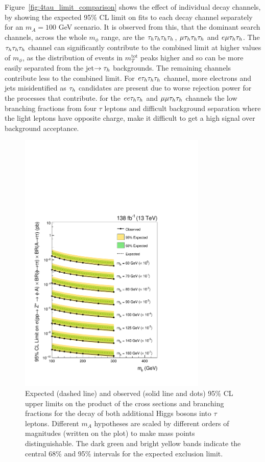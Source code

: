 Figure~\ref{fig:4tau_limit_comparison} shows the effect of individual decay channels, by showing the expected 95\% \ac{CL} limit on fits to each decay channel separately for an $m_{A} = 100$ GeV scenario.
It is observed from this, that the dominant search channels, across the whole $m_{\phi}$ range, are the $\tau_{h}\tau_{h}\tau_{h}\tau_{h}$, $\mu\tau_{h}\tau_{h}\tau_{h}$ and $e\mu\tau_{h}\tau_{h}$.
The $\tau_{h}\tau_{h}\tau_{h}$ channel can significantly contribute to the combined limit at higher values of $m_{\phi}$, as the distribution of events in $m_{T}^{\text{tot}}$ peaks higher and so can be more easily separated from the jet$\rightarrow\tau_{h}$ backgrounds.
The remaining channels contribute less to the combined limit.
For $e\tau_{h}\tau_{h}\tau_{h}$ channel, more electrons and jets misidentified as $\tau_{h}$ candidates are present due to worse rejection power for the processes that contribute.
for the $ee\tau_{h}\tau_{h}$ and $\mu\mu\tau_{h}\tau_{h}$ channels the low branching fractions from four $\tau$ leptons and difficult background separation where the light leptons have opposite charge, make it difficult to get a high signal over background acceptance.

\begin{figure}[!hbtp]
\centering
    \includegraphics[width=0.8\textwidth]{Figures/model_independent_limit_all.pdf}
\caption{Expected (dashed line) and observed (solid line and dots) 95\% CL upper limits on the product of the cross sections and branching fractions for the decay of both additional Higgs bosons into $\tau$ leptons. Different $m_{A}$ hypotheses are scaled by different orders of magnitudes (written on the plot) to make mass points distinguishable. The dark green and bright yellow bands indicate the central 68\% and 95\% intervals for the expected exclusion limit.}
\label{fig:4tau_mi}
\end{figure}

